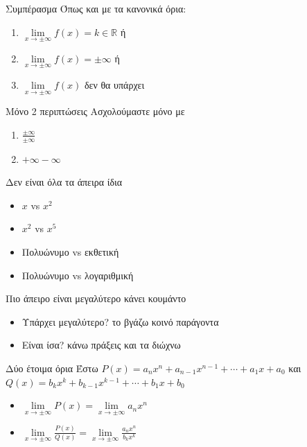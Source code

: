 \documentclass[greek]{beamer}
\begin{document}
\begin{frame}{Συμπέρασμα}
 Όπως και με τα κανονικά όρια:
 \begin{enumerate}
  \item $\lim\limits_{x \to \pm\infty}{ f(x) }=k\in\mathbb{R}$ ή
  \item $\lim\limits_{x \to \pm\infty}{ f(x) }=\pm\infty$ ή
  \item $\lim\limits_{x \to \pm\infty}{ f(x) }$ δεν θα υπάρχει
 \end{enumerate}
\end{frame}

\begin{frame}{Μόνο 2 περιπτώσεις}
 Ασχολούμαστε μόνο με
 \begin{enumerate}
  \item $\frac{\pm\infty}{\pm\infty}$
  \item $+\infty-\infty$
 \end{enumerate}
\end{frame}

\begin{frame}{Δεν είναι όλα τα άπειρα ίδια}
 \begin{itemize}
  \item $x$ vs $x^2$ \pause
  \item $x^2$ vs $x^5$ \pause
  \item Πολυώνυμο vs εκθετική \pause
  \item Πολυώνυμο vs λογαριθμική
 \end{itemize}
\end{frame}

\begin{frame}{Πιο άπειρο είναι μεγαλύτερο κάνει κουμάντο}
 \begin{itemize}
  \item Υπάρχει μεγαλύτερο? το βγάζω κοινό παράγοντα
  \item Είναι ίσα? κάνω πράξεις και τα διώχνω
 \end{itemize}
\end{frame}

\begin{frame}{Δύο έτοιμα όρια}
 Έστω $P(x)=a_nx^n+a_{n-1}x^{n-1}+\cdots +a_1x+a_0$ και $Q(x)=b_kx^k+b_{k-1}x^{k-1}+\cdots +b_1x+b_0$
 \begin{itemize}
  \item $\lim\limits_{x \to \pm\infty}{ P(x) }=\lim\limits_{x \to \pm\infty}{ a_nx^n }$
  \item $\lim\limits_{x \to \pm\infty}{ \frac{P(x)}{Q(x)} }=\lim\limits_{x \to \pm\infty}{ \frac{a_nx^n}{b_kx^k} }$
 \end{itemize}
\end{frame}
\end{document}
